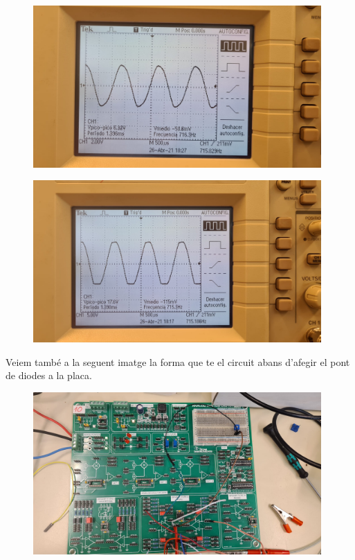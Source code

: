 \documentclass[12pt, a4papre]{article}
\begin{document}
	\begin{figure}[H]
		\begin{center}
		\includegraphics[width=110mm]{8_1.jpeg}
		\end{center}
	\end{figure}
	
	\begin{figure}[H]
		\begin{center}
		\includegraphics[width=110mm]{8_2.jpeg}
		\end{center}
	\end{figure}
	
	Veiem també a la seguent imatge la forma que te el circuit abans d'afegir el pont de diodes a la placa.
	
	\begin{figure}[H]
		\begin{center}
		\includegraphics[width=110mm]{8_3.jpeg}
		\end{center}
	\end{figure}
	
\end{document}
